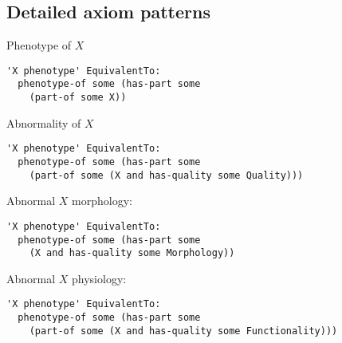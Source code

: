 \documentclass{bioinfo}
\begin{document}
\subsection{Detailed axiom patterns}

Phenotype of $X$
\begin{verbatim}
'X phenotype' EquivalentTo:
  phenotype-of some (has-part some
    (part-of some X))
\end{verbatim}

Abnormality of $X$
\begin{verbatim}
'X phenotype' EquivalentTo:
  phenotype-of some (has-part some
    (part-of some (X and has-quality some Quality)))
\end{verbatim}

Abnormal $X$ morphology:
\begin{verbatim}
'X phenotype' EquivalentTo:
  phenotype-of some (has-part some
    (X and has-quality some Morphology))
\end{verbatim}

Abnormal $X$ physiology:
\begin{verbatim}
'X phenotype' EquivalentTo:
  phenotype-of some (has-part some
    (part-of some (X and has-quality some Functionality)))
\end{verbatim}





\end{document}

